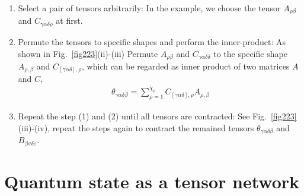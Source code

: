 \begin{enumerate}

	\item Select a pair of tensors arbitrarily: In the example, we choose the tensor $A_{\rho \beta}$ and $C_{\gamma \alpha \delta \rho}$ at first. 
	\item Permute the tensors to specific shapes and perform the inner-product: As shown in Fig.~\ref{fig223}(ii)-(iii) Permute $A_{\rho \beta}$ and $C_{\gamma \alpha \delta \delta}$ to the specific shape $A_{\rho, \beta}$ and $C_{[\gamma \alpha \delta], \rho}$, which can be regarded as inner product of two matrices $A$ and $C$, 
		\begin{align}
			\theta_{\gamma \alpha \delta \beta} = \sum_{\rho = 1}^{\chi_{\rho}}{C_{[\gamma \alpha \delta], \rho} A_{\rho, \beta}}
		\end{align}
	\item Repeat the step (1) and (2) until all tensors are contracted: See Fig.~\ref{fig223}(iii)-(iv), repeat the steps again to contract the remained tensors $\theta_{\gamma \alpha \delta \beta}$ and $B_{\beta \sigma \delta \varepsilon}$.
\end{enumerate}

\section{Quantum state as a tensor network} %
\label{sub:map2quan}

